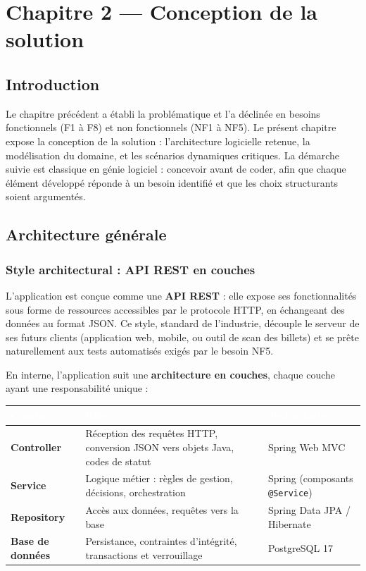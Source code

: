 \documentclass[12pt,a4paper]{report}
\newcommand{\code}[1]{\textcolor{codecolor}{\texttt{#1}}}
\begin{document}
\chapter{Chapitre 2 — Conception de la solution}

\section{Introduction}

Le chapitre précédent a établi la problématique et l'a déclinée en besoins fonctionnels (F1 à F8) et non fonctionnels (NF1 à NF5). Le présent chapitre expose la conception de la solution : l'architecture logicielle retenue, la modélisation du domaine, et les scénarios dynamiques critiques. La démarche suivie est classique en génie logiciel : concevoir avant de coder, afin que chaque élément développé réponde à un besoin identifié et que les choix structurants soient argumentés.

\section{Architecture générale}

\subsection{Style architectural : API REST en couches}

L'application est conçue comme une \textbf{API REST} : elle expose ses fonctionnalités sous forme de ressources accessibles par le protocole HTTP, en échangeant des données au format JSON. Ce style, standard de l'industrie, découple le serveur de ses futurs clients (application web, mobile, ou outil de scan des billets) et se prête naturellement aux tests automatisés exigés par le besoin NF5.

En interne, l'application suit une \textbf{architecture en couches}, chaque couche ayant une responsabilité unique :

\begin{center}\small
\begin{longtable}{|p{5.00cm}|p{5.00cm}|p{5.00cm}|}
\hline
\rowcolor{entetetable}
\textbf{\textcolor{white}{Couche}} & \textbf{\textcolor{white}{Rôle}} & \textbf{\textcolor{white}{Technologie}} \\ \hline
\textbf{Controller} & Réception des requêtes HTTP, conversion JSON  vers  objets Java, codes de statut & Spring Web MVC \\ \hline
\textbf{Service} & Logique métier : règles de gestion, décisions, orchestration & Spring (composants \code{@Service}) \\ \hline
\textbf{Repository} & Accès aux données, requêtes vers la base & Spring Data JPA / Hibernate \\ \hline
\textbf{Base de données} & Persistance, contraintes d'intégrité, transactions et verrouillage & PostgreSQL 17 \\ \hline
\end{longtable}\end{center}
\end{document}

